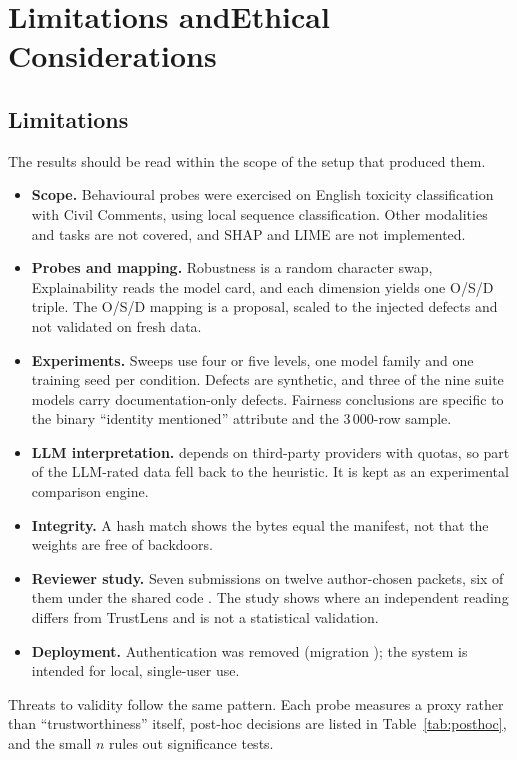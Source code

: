 \chapter[Limitations and Ethical Considerations]{Limitations and\linebreak Ethical Considerations}\label{ch:limits}

\section{Limitations}
The results should be read within the scope of the setup that produced them.
\begin{itemize}
\item \textbf{Scope.} Behavioural probes were exercised on English toxicity classification with Civil Comments, using local  sequence classification. Other modalities and tasks are not covered, and SHAP and LIME are not implemented.
\item \textbf{Probes and mapping.} Robustness is a random character swap, Explainability reads the model card, and each dimension yields one O/S/D triple. The O/S/D mapping is a proposal, scaled to the injected defects and not validated on fresh data.
\item \textbf{Experiments.} Sweeps use four or five levels, one model family and one training seed per condition. Defects are synthetic, and three of the nine suite models carry documentation-only defects. Fairness conclusions are specific to the binary ``identity mentioned'' attribute and the 3\,000-row sample.
\item \textbf{LLM interpretation.}  depends on third-party providers with quotas, so part of the LLM-rated data fell back to the heuristic. It is kept as an experimental comparison engine.
\item \textbf{Integrity.} A hash match shows the bytes equal the manifest, not that the weights are free of backdoors.
\item \textbf{Reviewer study.} Seven submissions on twelve author-chosen packets, six of them under the shared code . The study shows where an independent reading differs from TrustLens and is not a statistical validation.
\item \textbf{Deployment.} Authentication was removed (migration ); the system is intended for local, single-user use.
\end{itemize}
Threats to validity follow the same pattern. Each probe measures a proxy rather than ``trustworthiness'' itself, post-hoc decisions are listed in Table~\ref{tab:posthoc}, and the small $n$ rules out significance tests.

